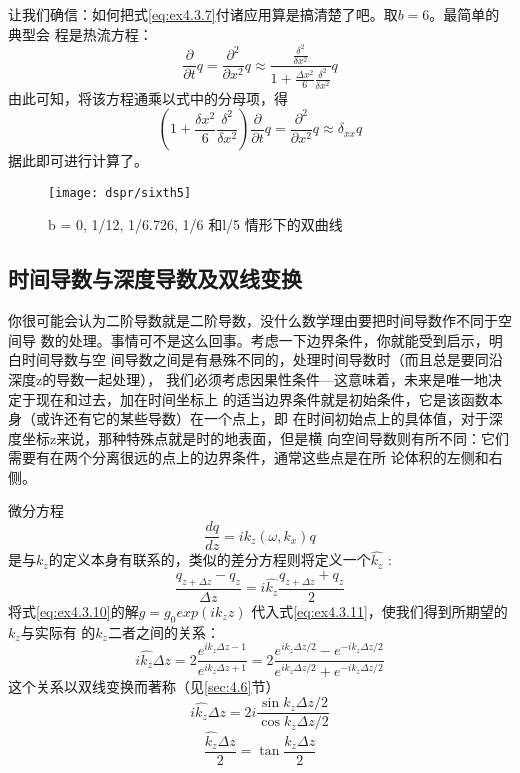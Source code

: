 让我们确信：如何把式\ref{eq:ex4.3.7}付诸应用算是搞清楚了吧。取$b
= 6$。最简单的典型会
程是热流方程：
\begin{equation}
\frac{\partial}{\partial t}q=
\frac{\partial^2}{\partial x^2}q\approx
\frac{\frac{\delta^2}{\delta x^2}}{1+\frac{\Delta x^2}{6}
\frac{\delta^2}{\delta x^2}}q
\label{eq:ex4.3.8}
\end{equation}
由此可知，将该方程通乘以式中的分母项，得
\begin{equation}
(1+\frac{\delta x^2}{6}\frac{\delta^2}{\delta x^2})
\frac{\partial}{\partial t}q=
\frac{\partial^2}{\partial x^2}q\approx
\delta_{xx}q
\label{eq:ex4.3.9}
\end{equation}
据此即可进行计算了。

\begin{figure}[H]
\centering
\texttt{[image: dspr/sixth5]}
\caption[sixth5]{ b = 0, 1/12, 1/6.726, 1/6 和l/5 情形下的双曲线}
\label{fig:dspr/sixth5}
\end{figure}

\subsection{时间导数与深度导数及双线变换}
\label{sec:4.3.4}

你很可能会认为二阶导数就是二阶导数，没什么数学理由要把时间导数作不同于空间导
数的处理。事情可不是这么回事。考虑一下边界条件，你就能受到启示，明白时间导数与空
间导数之间是有悬殊不同的，处理时间导数时（而且总是要同沿深度z的导数一起处理），
我们必须考虑因果性条件---这意味着，未来是唯一地决定于现在和过去，加在时间坐标上
的适当边界条件就是初始条件，它是该函数本身（或许还有它的某些导数）在一个点上，即
在时间初始点上的具体值，对于深度坐标z来说，那种特殊点就是时的地表面，但是横
向空间导数则有所不同：它们需要有在两个分离很远的点上的边界条件，通常这些点是在所
论体积的左侧和右侧。

微分方程
\begin{equation}
\frac{dq}{dz}=ik_z(\omega
,k_x)q
\label{eq:ex4.3.10}
\end{equation}
是与$k_z$的定义本身有联系的，类似的差分方程则将定义一个$\hat{k_z}$ :
\begin{equation}
\frac{q_{z+\Delta z}-q_z}{\Delta z}=i\hat{k_z}
\frac{q_{z+\Delta z}+q_z}{2}
\label{eq:ex4.3.11}
\end{equation}
将式\ref{eq:ex4.3.10}的解$g=g_0exp(ik_zz)$
代入式\ref{eq:ex4.3.11}，使我们得到所期望的$k_z$与实际有
的$k_z$二者之间的关系：
\begin{equation}
i\hat{k_z}\Delta z=
2\frac{e^{ik_z\Delta z-1}}{e^{ik_z\Delta z+1}}=
2\frac{e^{ik_z\Delta z/2}-e^{-ik_z\Delta z/2}}
{e^{ik_z\Delta z/2}+e^{-ik_z\Delta z/2}}
\label{eq:ex4.3.12}
\end{equation}
这个关系以双线变换而著称（见\ref{sec:4.6}节）
\begin{equation}
i\hat{k_z}\Delta z=2i\frac{\sin k_z\Delta z/2}{\cos k_z\Delta z/2}
\label{eq:ex4.3.13}
\end{equation}
\begin{equation}
\frac{\hat{k_z}\Delta z}{2}=\tan\frac{k_z\Delta z}{2}
\label{eq:ex4.3.14}
\end{equation}

